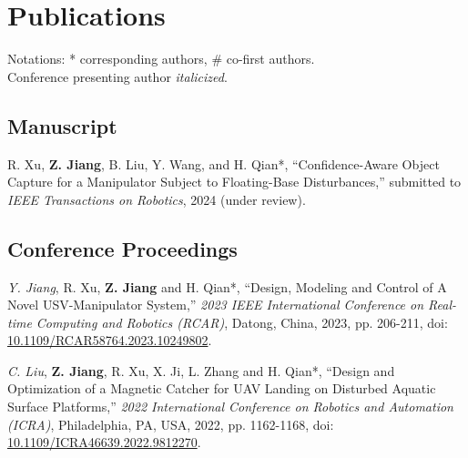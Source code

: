 \documentclass[11pt,letterpaper]{report}
\begin{document}
\section*{Publications}
Notations: * corresponding authors, \# co-first authors. \\ Conference presenting author \textit{italicized}.

\subsection*{Manuscript}
\begin{tablist}
	\item[2024]  \tab{}R. Xu, \textbf{Z. Jiang}, B. Liu, Y. Wang, and H. Qian*, ``Confidence-Aware Object Capture for a Manipulator Subject to Floating-Base Disturbances,'' submitted to \textit{IEEE Transactions on Robotics}, 2024 (under review).
\end{tablist}

\subsection*{Conference Proceedings}
\begin{tablist}
	\item[2023]   \tab{}\textit{Y. Jiang}, R. Xu, \textbf{Z. Jiang} and H. Qian*, ``Design, Modeling and Control of A Novel USV-Manipulator System,'' \textit{2023 IEEE International Conference on Real-time Computing and Robotics (RCAR)}, Datong, China, 2023, pp. 206-211, doi: \href{https://doi.org/10.1109/RCAR58764.2023.10249802}{ 10.1109/RCAR58764.2023.10249802}.
	
	\item[2022]   \tab{}\textit{C. Liu}, \textbf{Z. Jiang}, R. Xu, X. Ji, L. Zhang and H. Qian*, ``Design and Optimization of a Magnetic Catcher for UAV Landing on Disturbed Aquatic Surface Platforms,'' \textit{2022 International Conference on Robotics and Automation (ICRA)}, Philadelphia, PA, USA, 2022, pp. 1162-1168, doi: \href{https://doi.org/10.1109/ICRA46639.2022.9812270}{ 10.1109/ICRA46639.2022.9812270}.
\end{tablist}
\end{document}
